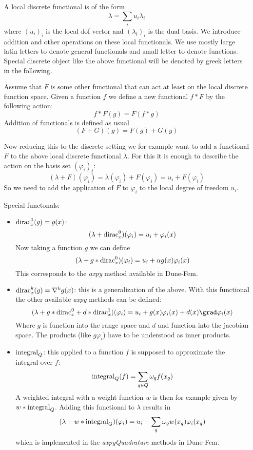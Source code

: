 \documentclass[12pt,a4paper]{article}
\newcommand{\dirac}{ {\rm dirac} }
\newcommand{\integral}{ {\rm integral} }
\begin{document}
A local discrete functional is of the form
$$ \lambda = \sum_i u_i\lambda_i $$
where $(u_i)_i$ is the local dof vector and $(\lambda_i)_i$ is the dual
basis. We introduce addition and other operations on these local
functionals. We use mostly large latin letters to denote general
functionals and small letter to denote functions. Special discrete object
like the above functional will be denoted by greek letters in the
following.

Assume that $F$ is some other functional that can act at least on the
local discrete function space. Given a function $f$ we define a new
functional $f*F$ by the following action:
$$ f*F(g) = F(f*g) $$
Addition of functionals is defined as usual
$$ (F+G)(g) = F(g)+G(g) $$

Now reducing this to the discrete setting we for example want to add a
functional $F$ to the above local discrete functional $\lambda$. For this
it is enough to describe the action on the basis set $(\varphi_i)_i$:
$$ (\lambda+F)(\varphi_i) = \lambda(\varphi_i) + F(\varphi_i)
   = u_i + F(\varphi_i) $$
So we need to add the application of $F$ to $\varphi_i$ to the local
degree of freedom $u_i$. 

Special functonals:
\begin{itemize}
\item $\dirac^0_x(g)=g(x)$: 
  $$ (\lambda + \dirac^0_x)(\varphi_i) = u_i + \varphi_i(x) $$
  Now taking a function $g$ we can define
  $$ (\lambda + g*\dirac^0_x)(\varphi_i) = u_i + \alpha g(x)\varphi_i(x) $$
  This corresponds to the \emph{axpy} method available in Dune-Fem.
\item $\dirac^k_x(g)=\nabla^k g(x)$: this is a generalization of the above.
  With this functional the other available \emph{axpy} methods can be
  defined:
  $$ (\lambda + g*\dirac^0_x + d*\dirac^1_x)(\varphi_i) =
     u_i + g(x)\varphi_i(x) + d(x)\grad\varphi_i(x) $$
  Where $g$ is function into the range space and $d$ and function into the
  jacobian space. The products (like $g\varphi_i$) have to be understood as inner products. 
\item $\integral_Q$: this applied to a function $f$ is supposed to
  approximate the integral over $f$: 
  $$ \integral_Q(f) = \sum_{q\in Q} \omega_q f(x_q) $$
  A weighted integral with a weight function $w$ is then for example given
  by $w*\integral_Q$. Adding this functional to $\lambda$ results in
  $$ (\lambda + w*\integral_Q)(\varphi_i) = 
     u_i + \sum_q \omega_q w(x_q)\varphi_i(x_q) $$ 
  which is implemented in the \emph{axpyQuadrature} methods in Dune-Fem.
\end{itemize}
\end{document}
